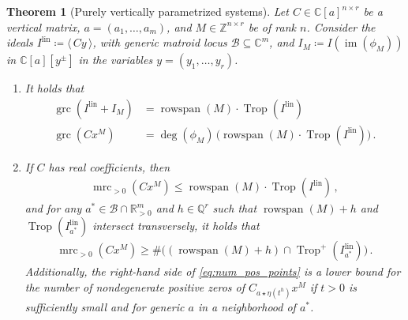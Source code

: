 \documentclass[10pt,a4paper]{amsart}
\newtheorem{theorem}{Theorem}
\newcommand{\CC}{\mathbb{C}}
\newcommand{\QQ}{\mathbb{Q}}
\newcommand{\RR}{\mathbb{R}}
\DeclareMathOperator{\Trop}{Trop}
\DeclareMathOperator{\grc}{grc}
\DeclareMathOperator{\im}{im}
\newcommand{\lin}{{\mathrm{lin}}}
\DeclareMathOperator{\mrc}{mrc}
\DeclareMathOperator{\rowspan}{rowspan}
\begin{document}
\begin{theorem}[Purely vertically parametrized systems]
\label{thm:bound_purevertical}
Let $C \in \mathbb{C}[a]^{n \times r}$ be   a vertical matrix, $a=(a_1,\dots,a_m)$, and $M \in \mathbb{Z}^{n \times r}$ be of rank $n$. Consider the ideals $I^{\lin} \coloneqq \langle\,C y\,\rangle$, with generic matroid locus $\mathcal{B}\subseteq\CC^m$, and $I_M\coloneqq I(\im(\phi_M))$ in $\CC[a][y^\pm]$ in the variables $y=(y_1,\dots,y_r)$. 
\begin{enumerate}[label=(\roman*)]
    \item  It holds that 
\begin{align*}
\grc ( I^{\lin} + I_M  ) &= \rowspan(M)\cdot \Trop(I^{\lin} )\, \\
\grc(C x^M  ) &=  \deg(\phi_M) \, \big(\rowspan(M)\cdot \Trop(I^{\lin})\big)\, .
\end{align*}
\item If $C$ has real coefficients, then 
\begin{align}
\label{eq:max_num_pos_points} \mrc_{>0}(C  x^M ) \leq  \rowspan(M)\cdot \Trop(I^{\lin})  \,, 
\end{align}
and  for  any $a^*\in \mathcal{B}\cap\RR^m_{>0}$
and $h\in\QQ^r$ such that 
$\rowspan(M)+h$ and $\Trop(I^{\lin}_{a^*})$ intersect transversely, it holds that
\begin{align}
\label{eq:num_pos_points} 
\mrc_{>0}(C x^M) \geq \# \big((\rowspan(M)+h)\cap \Trop^+(I^{\lin}_{a^*})\big)\, .
\end{align}
Additionally, the right-hand side of \eqref{eq:num_pos_points} is a lower bound for the number of nondegenerate positive zeros of $C_{a\star \eta(t^h)} x^M$ if $t>0$ is sufficiently small and for generic $a$ in a neighborhood of $a^*$. 
\end{enumerate}
\end{theorem}
\end{document}
